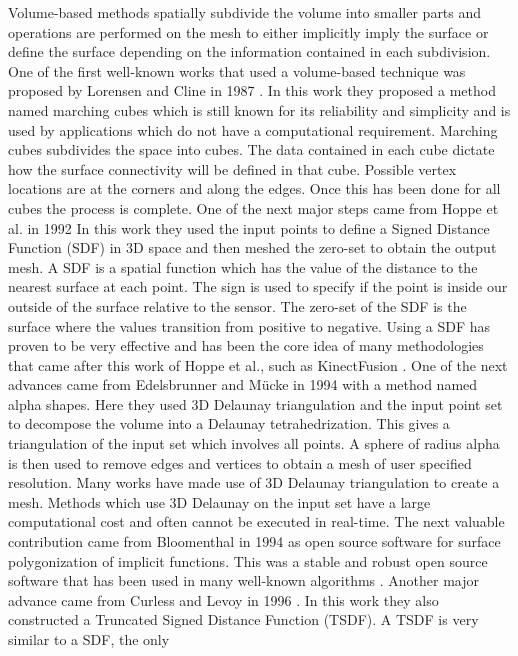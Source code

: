 Volume-based methods spatially subdivide the volume into smaller parts and
operations are performed on the mesh to either implicitly imply the surface
or define the surface depending on the information contained in each
subdivision. One of the first well-known works that used a volume-based
technique was proposed by Lorensen and Cline in 1987 \cite{Lorensen1987}.
In this work they proposed a method named marching cubes which is still
known for its reliability and simplicity and is used by applications which
do not have a computational requirement. Marching cubes subdivides the
space into cubes. The data contained in each cube dictate how the surface
connectivity will be defined in that cube. Possible vertex locations are at
the corners and along the edges. Once this has been done for all cubes the
process is complete. One of the next major steps came from Hoppe et al. in
1992 \cite{Hoppe1992} In this work they used the input points to define a
Signed Distance Function (SDF) in 3D space and then meshed the zero-set to
obtain the output mesh. A SDF is a spatial function which has the value of
the distance to the nearest surface at each point. The sign is used to
specify if the point is inside our outside of the surface relative to the
sensor. The zero-set of the SDF is the surface where the values transition
from positive to negative. Using a SDF has proven to be very effective and
has been the core idea of many methodologies that came after this work of
Hoppe et al., such as KinectFusion \cite{Newcombe2011a}. One of the next
advances came from Edelsbrunner and M\"{u}cke in 1994
\cite{Edelsbrunner1994} with a method named alpha shapes. Here they used 3D
Delaunay triangulation and the input point set to decompose the volume into
a Delaunay tetrahedrization. This gives a triangulation of the input set
which involves all points. A sphere of radius alpha is then used to remove
edges and vertices to obtain a mesh of user specified resolution. Many
works have made use of 3D Delaunay triangulation to create a mesh. Methods
which use 3D Delaunay on the input set have a large computational cost and
often cannot be executed in real-time.  The next valuable contribution came
from Bloomenthal in 1994 \cite{Bloomenthal1994} as open source software for
surface polygonization of implicit functions. This was a stable and robust
open source software that has been used in many well-known algorithms
\cite{Newcombe2010}.  Another major advance came from Curless and Levoy in
1996 \cite{Curless1996}. In this work they also constructed a Truncated
Signed Distance Function (TSDF). A TSDF is very similar to a SDF, the only
